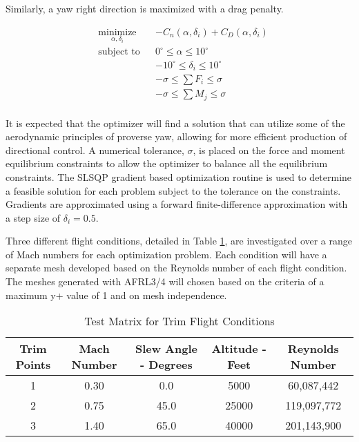 \noindent Similarly, a yaw right direction is maximized with a drag penalty.

\begin{equation}
  \begin{aligned}
  & \underset{\alpha, \delta_i}{\text{minimize}}
  & &  -C_n  \left(\alpha, \delta_i \right) + C_D \left(\alpha, \delta_i \right) \\
  & \text{subject to}
    & &   0^\circ \leq \alpha \leq 10^\circ \\
  & & & -10^\circ \leq \delta_i \leq 10^\circ \\
  & & & -\sigma \leq \sum F_i  \leq \sigma \\
  & & & -\sigma \leq \sum M_j  \leq \sigma \\
  \end{aligned}
  \label{eq:method:trimProblem_2}
\end{equation}

It is expected that the optimizer will find a solution that can utilize some of the aerodynamic principles of proverse yaw, allowing for more efficient production of directional control.
A numerical tolerance, $\sigma$, is placed on the force and moment equilibrium constraints to allow the optimizer to balance all the equilibrium constraints.
The SLSQP gradient based optimization routine is used to determine a feasible solution for each problem subject to the tolerance on the constraints.
Gradients are approximated using a forward finite-difference approximation with a step size of $\delta_i=0.5$.

Three different flight conditions, detailed in Table \ref{tab:method:trimPoints}, are investigated over a range of Mach numbers for each optimization problem.
Each condition will have a separate mesh developed based on the Reynolds number of each flight condition.
The meshes generated with AFRL3/4 will chosen based on the criteria of a maximum y+ value of 1 and on mesh independence.


\begin{table}[h]
  \caption{Test Matrix for Trim Flight Conditions}
  \centering
  \begin{tabular}{ccccc}
    \toprule[1.5pt]
    \textbf{Trim Points} & \textbf{Mach Number} & \textbf{Slew Angle - Degrees} & \textbf{Altitude - Feet} & \textbf{Reynolds Number}\\
    \midrule
    1 & 0.30 &  0.0 &  5000 & 60,087,442 \\
    2 & 0.75 & 45.0 & 25000 & 119,097,772 \\
    3 & 1.40 & 65.0 & 40000 & 201,143,900 \\
    \bottomrule[1.5pt]
  \end{tabular}
  \label{tab:method:trimPoints}
\end{table}
\FloatBarrier

